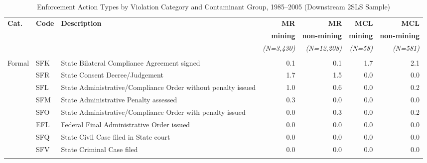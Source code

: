 
\begin{table}[htbp]
\centering
\caption{Enforcement Action Types by Violation Category and Contaminant Group, 1985--2005 (Downstream 2SLS Sample)}
\label{tab:enf_action_type_dwnstrm}
\small
\begin{tabular}{llp{5.8cm}rrrr}
\hline\hline
\textbf{Cat.} & \textbf{Code} & \textbf{Description} & \textbf{MR} & \textbf{MR} & \textbf{MCL} & \textbf{MCL} \\
 & & & \textbf{mining} & \textbf{non-mining} & \textbf{mining} & \textbf{non-mining} \\
 & & & \textit{(N=3,430)} & \textit{(N=12,208)} & \textit{(N=58)} & \textit{(N=581)} \\
\hline
\addlinespace[4pt]
\multicolumn{7}{l}{\textit{Formal enforcement}} \\
\addlinespace[2pt]
Formal & SFK & State Bilateral Compliance Agreement signed & 0.1 & 0.1 & 1.7 & 2.1 \\
 & SFR & State Consent Decree/Judgement & 1.7 & 1.5 & 0.0 & 0.0 \\
 & SFL & State Administrative/Compliance Order without penalty issued & 1.0 & 0.6 & 0.0 & 0.2 \\
 & SFM & State Administrative Penalty assessed & 0.3 & 0.0 & 0.0 & 0.0 \\
 & SFO & State Administrative/Compliance Order with penalty issued & 0.0 & 0.3 & 0.0 & 0.2 \\
 & EFL & Federal Final Administrative Order issued & 0.0 & 0.0 & 0.0 & 0.0 \\
 & SFQ & State Civil Case filed in State court & 0.0 & 0.0 & 0.0 & 0.0 \\
 & SFV & State Criminal Case filed & 0.0 & 0.0 & 0.0 & 0.0 \\
\addlinespace[4pt]
\multicolumn{7}{l}{\textit{Informal enforcement}} \\

\end{tabular}
\end{table}

